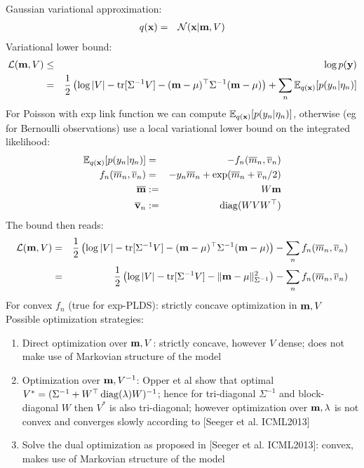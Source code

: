 \documentclass[10pt,english]{article}
\begin{document}
Gaussian variational approximation:
\begin{eqnarray}
 q(\mathbf{x})				&=&	\mathcal{N}(\mathbf{x}\vert\mathbf{m},V)
\end{eqnarray}
Variational lower bound:
\begin{eqnarray}
 \mathcal L(\mathbf{m},V)		&\leq& \log p(\mathbf{y})\\
				&=&	\frac{1}{2}\left(\log\vert V\vert-\operatorname{tr}[\Sigma^{-1}V]-(\mathbf{m}-\mu)^\top \Sigma^{-1}(\mathbf{m}-\mu)     \right)
					+\sum_{n} \mathbb{E}_{q(\mathbf{x})}[p(y_n\vert \eta_n)]
\end{eqnarray}
For Poisson with exp link function we can compute $\mathbb{E}_{q(\mathbf{x})}[p(y_n\vert \eta_n)]$, otherwise (eg for Bernoulli observations) use a local variational lower bound on the integrated likelihood:
\begin{eqnarray}
 \mathbb{E}_{q(\mathbf{x})}[p(y_n\vert \eta_n)]	&=& 	-f_n(\overline m_n,\overline v_n)\\
 f_n(\overline m_n,\overline v_n)	&=&	-y_n\overline m_n+\exp(\overline m_n+\overline v_n/2)\\
 \overline {\mathbf{m}}				&:=&	W\mathbf{m}\\
 \overline{ \mathbf{v}}_n		&:=&	\operatorname{diag}(WVW^\top)
\end{eqnarray}
The bound then reads:
\begin{eqnarray}
 \mathcal L(\mathbf{m},V)	&=&	\frac{1}{2}\left(\log\vert V\vert-\operatorname{tr}[\Sigma^{-1}V]-(\mathbf{m}-\mu)^\top \Sigma^{-1}(\mathbf{m}-\mu)     \right)
					-\sum_{n} f_n(\overline m_n,\overline v_n)\\
			&=&	\frac{1}{2}\left(\log\vert V\vert-\operatorname{tr}[\Sigma^{-1}V]-\Vert\mathbf{m}-\mu\Vert^2_{\Sigma^{-1}}    \right)-\sum_{n} f_n(\overline m_n,\overline v_n)
\end{eqnarray}
For convex $f_n$ (true for exp-PLDS): strictly concave optimization in $\mathbf{m},V$\\
Possible optimization strategies:
\begin{enumerate}
 \item Direct optimization over $\mathbf{m},V$: strictly concave, however $V$ dense; does not make use of Markovian structure of the model 
 \item Optimization over $\mathbf{m},V^{-1}$: Opper et al show that optimal $V^\ast=(\Sigma^{-1}+W^\top \operatorname{diag}(\lambda)W)^{-1}$; hence for tri-diagonal $\Sigma^{-1}$ and block-diagonal $W$ then
       $V^\ast$ is also tri-diagonal; however optimization over $\mathbf{m},\lambda$ is not convex and converges slowly according to [Seeger et al. ICML2013]
 \item Solve the dual optimization as proposed in [Seeger et al. ICML2013]: convex, makes use of Markovian structure of the model 
\end{enumerate}
\end{document}
